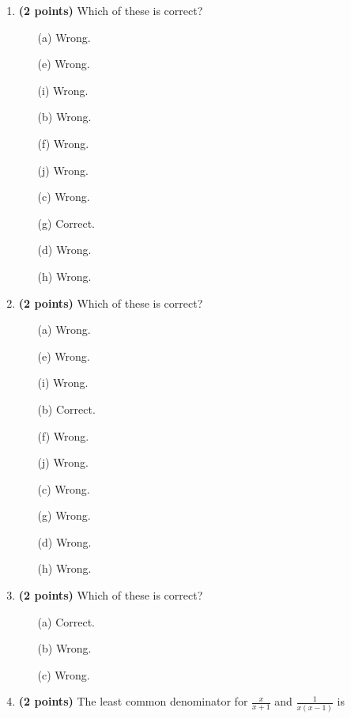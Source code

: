 \documentclass[12pt]{amsart}
\begin{document}
\newpage
\begin{enumerate}
\item {\bf (2 points)} 
 Which of these is correct?

\begin{minipage}[t]{1.0\linewidth}\begin{multicols}{4}\begin{itemize}\item[(a)]  Wrong. \item[(e)]  Wrong. \item[(i)]  Wrong. \item[(b)]  Wrong. \item[(f)]  Wrong. \item[(j)]  Wrong. \item[(c)]  Wrong. \item[(g)]  Correct. \item[] \item[(d)]  Wrong. \item[(h)]  Wrong. \item[] \end{itemize}\end{multicols}\end{minipage} \vfill 
\item {\bf (2 points)} 
 Which of these is correct?

\begin{minipage}[t]{1.0\linewidth}\begin{multicols}{4}\begin{itemize}\item[(a)]  Wrong. \item[(e)]  Wrong. \item[(i)]  Wrong. \item[(b)]  Correct. \item[(f)]  Wrong. \item[(j)]  Wrong. \item[(c)]  Wrong. \item[(g)]  Wrong. \item[] \item[(d)]  Wrong. \item[(h)]  Wrong. \item[] \end{itemize}\end{multicols}\end{minipage} \vfill 
\item {\bf (2 points)} 
 Which of these is correct?

\begin{minipage}[t]{1.0\linewidth}\begin{multicols}{3}\begin{itemize}\item[(a)]  Correct. \item[(b)]  Wrong. \item[(c)]  Wrong. \end{itemize}\end{multicols}\end{minipage} \vfill 
\item {\bf (2 points)} 
 The least common denominator for $\displaystyle \frac{x}{x+1}$ and $\displaystyle \frac{1}{x(x-1)}$ is \vspace{.2cm}


\end{enumerate}
\end{document}
